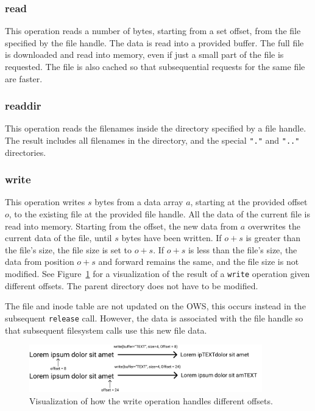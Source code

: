 \subsubsection{read}
This operation reads a number of bytes, starting from a set offset, from the file specified by the file handle. The data is read into a provided buffer. The full file is downloaded and read into memory, even if just a small part of the file is requested. The file is also cached so that subsequential requests for the same file are faster. 

\subsubsection{readdir}
This operation reads the filenames inside the directory specified by a file handle. The result includes all filenames in the directory, and the special \texttt{"."} and \texttt{".."} directories.

\subsubsection{write}
This operation writes $s$ bytes from a data array $a$, starting at the provided offset $o$, to the existing file at the provided file handle. All the data of the current file is read into memory. Starting from the offset, the new data from $a$ overwrites the current data of the file, until $s$ bytes have been written. If $o + s$ is greater than the file's size, the file size is set to $o + s$. If $o + s$ is less than the file's size, the data from position $o + s$ and forward remains the same, and the file size is not modified. See Figure~\ref{fig:write_flow} for a visualization of the result of a \texttt{write} operation given different offsets. The parent directory does not have to be modified. 

The file and inode table are not updated on the \gls{OWS}, this occurs instead in the subsequent \texttt{release} call. However, the data is associated with the file handle so that subsequent filesystem calls use this new file data.

\begin{figure}[!ht]
	\begin{center}
	  \includegraphics[width=0.9\textwidth]{figures/write_flow.png}
	\end{center}
	\caption{Visualization of how the write operation handles different offsets.}
	\label{fig:write_flow}
\end{figure}


